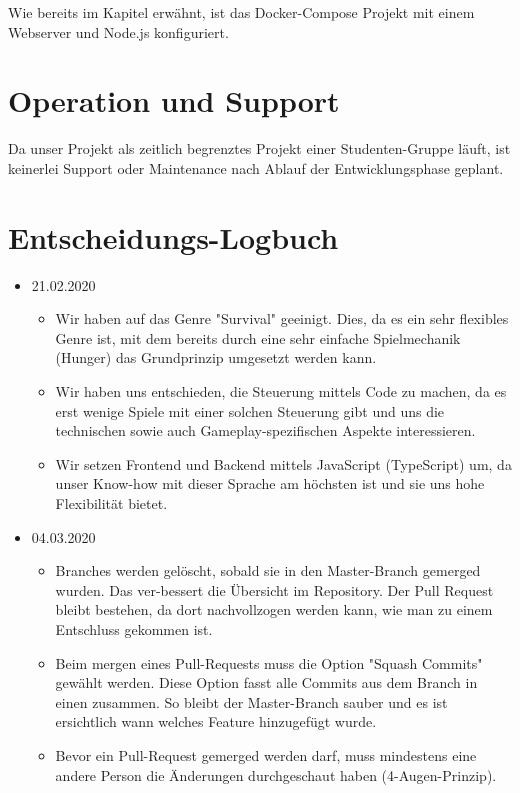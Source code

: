 \documentclass[11pt,a4paper,german]{scrartcl}
\let\oldsection\section
\renewcommand\section{\clearpage\oldsection}
\begin{document}
Wie bereits im Kapitel \textit{} erwähnt, ist das Docker-Compose Projekt mit einem Webserver und Node.js konfiguriert.

\section{Operation und Support}

Da unser Projekt als zeitlich begrenztes Projekt einer Studenten-Gruppe läuft, ist keinerlei Support oder Maintenance nach Ablauf der Entwicklungsphase geplant.

\section{Entscheidungs-Logbuch}

\begin{itemize}
  \item 21.02.2020
        \begin{itemize}
          \item Wir haben auf das Genre "Survival" geeinigt. Dies, da es ein sehr flexibles Genre ist, mit dem bereits durch eine sehr einfache Spielmechanik (Hunger) das Grundprinzip umgesetzt werden kann.
          \item Wir haben uns entschieden, die Steuerung mittels Code zu machen, da es erst wenige Spiele mit einer solchen Steuerung gibt und uns die technischen sowie auch Gameplay-spezifischen Aspekte interessieren.
          \item Wir setzen Frontend und Backend mittels JavaScript (TypeScript) um, da unser Know-how mit dieser Sprache am höchsten ist und sie uns hohe Flexibilität bietet.
        \end{itemize}
  \item 04.03.2020
        \begin{itemize}
          \item Branches werden gelöscht, sobald sie in den Master-Branch gemerged wurden. Das ver-bessert die Übersicht im Repository. Der Pull Request bleibt bestehen, da dort nachvollzogen werden kann, wie man zu einem Entschluss gekommen ist.
          \item Beim mergen eines Pull-Requests muss die Option "Squash Commits" gewählt werden. Diese Option fasst alle Commits aus dem Branch in einen zusammen. So bleibt der Master-Branch sauber und es ist ersichtlich wann welches Feature hinzugefügt wurde.
          \item Bevor ein Pull-Request gemerged werden darf, muss mindestens eine andere Person die Änderungen durchgeschaut haben (4-Augen-Prinzip).

\end{itemize}
\end{itemize}
\end{document}
